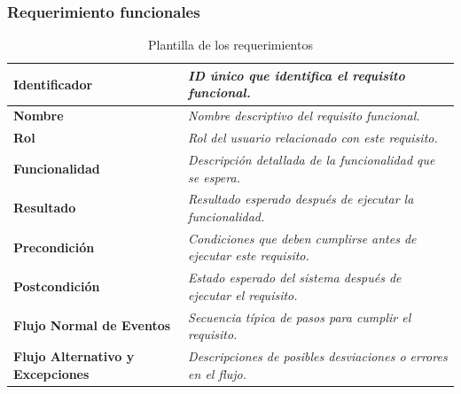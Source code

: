 \subsubsection{Requerimiento funcionales}

\begin{table}[!htb]
    \centering
    \caption{Plantilla de los requerimientos}
    \begin{tabular}{|p{3cm}|p{10cm}|}
    \hline
    \textbf{Identificador} & \textit{ID único que identifica el requisito funcional.} \\ \hline
    \textbf{Nombre} & \textit{Nombre descriptivo del requisito funcional.} \\ \hline
    \textbf{Rol} & \textit{Rol del usuario relacionado con este requisito.} \\ \hline
    \textbf{Funcionalidad} & \textit{Descripción detallada de la funcionalidad que se espera.} \\ \hline
    \textbf{Resultado} & \textit{Resultado esperado después de ejecutar la funcionalidad.} \\ \hline
    \textbf{Precondición} & \textit{Condiciones que deben cumplirse antes de ejecutar este requisito.} \\ \hline
    \textbf{Postcondición} & \textit{Estado esperado del sistema después de ejecutar el requisito.} \\ \hline
    \textbf{Flujo Normal de Eventos} & \textit{Secuencia típica de pasos para cumplir el requisito.} \\ \hline
    \textbf{Flujo Alternativo y Excepciones} & \textit{Descripciones de posibles desviaciones o errores en el flujo.} \\ \hline
    \end{tabular}
    \label{tabla:req-funcionales}
\end{table}
\FloatBarrier


